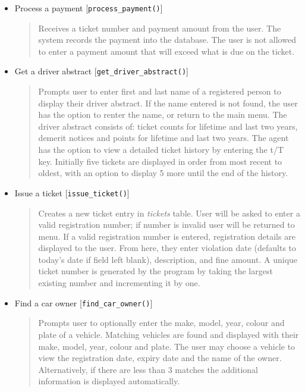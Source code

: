 \documentclass[10pt, a4paper]{article}
\begin{document}
{\begin{itemize}
\item Process a payment [\texttt{process\_payment()}]
	\begin{quotation}
	\noindent Receives a ticket number and payment amount from the user. The system records the payment into the database. The user is not allowed to enter a payment amount that will exceed what is due on the ticket.
	\end{quotation}

\item Get a driver abstract [\texttt{get\_driver\_abstract()}]
	\begin{quotation}
	\noindent Prompts user to enter first and last name of a registered person to display their driver abstract. If the name entered is not found, the user has the option to renter the name, or return to the main menu. The driver abstract consists of: ticket counts for lifetime and last two years, demerit notices and points for lifetime and last two years. The agent has the option to view a detailed ticket history by entering the t/T key. Initially five tickets are displayed in order from most recent to oldest, with an option to display 5 more until the end of the history.
	\end{quotation}

\item Issue a ticket [\texttt{issue\_ticket()}]
	\begin{quotation}
	\noindent Creates a new ticket entry in \emph{tickets} table. User will be asked to enter a valid registration number; if number is invalid user will be returned to menu. If a valid registration number is entered, registration details are displayed to the user. From here, they enter violation date (defaults to today's date if field left blank), description, and fine amount. A unique ticket number is generated by the program by taking the largest existing number and incrementing it by one. 
	\end{quotation}
\newpage
\item Find a car owner [\texttt{find\_car\_owner()}]
	\begin{quotation}
	\noindent Prompts user to optionally enter the make, model, year, colour and plate of a vehicle. Matching vehicles are found and displayed with their make, model, year, colour and plate. The user may choose a vehicle to view the registration date, expiry date and the name of the owner. Alternatively, if there are less than 3 matches the additional information is displayed automatically.
	\end{quotation}


\end{itemize}}
\end{document}

